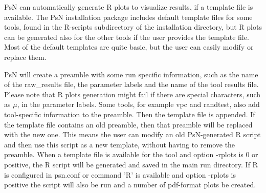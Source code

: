 
PsN can automatically generate R plots to visualize results, 
if a template file is available.
The PsN installation package includes default template files for some
tools, found in the R-scripts subdirectory of the installation directory, 
but R plots can be generated also for the other tools
if the user provides the template file.
Most of the default templates are quite basic, but 
the user can easily modify or replace them.

PsN will create a preamble with some run specific information, 
such as the name of the raw\_results file, the parameter labels and the name of
the tool results file. Please note that R plots generation might fail if there are special characters,
such as $\mu$, in the parameter labels.
Some tools, for example vpc and randtest, also add
tool-specific information to the preamble. 
Then the template file is appended.
If the template file contains an old preamble, then that preamble will be replaced with 
the new one. This means
the user can modify an old PsN-generated R script and then use this script as a new template,
without having to remove the preamble.
When a template file is available for the tool and option \mbox{-rplots} is 0 or positive, 
the R script will be generated and saved in the main
run directory. 
If R is configured in psn.conf or command 'R' is available and option -rplots is positive 
the script will also be run and a number of pdf-format plots be created.

\rplotsconditions

